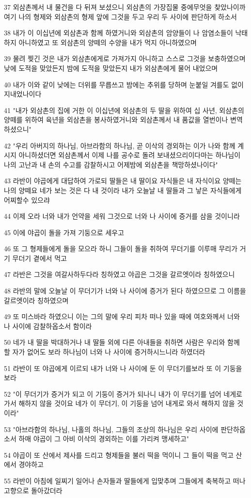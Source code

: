 \par 37 외삼촌께서 내 물건을 다 뒤져 보셨으니 외삼촌의 가장집물 중에무엇을 찾았나이까 여기 나의 형제와 외삼촌의 형제 앞에 그것을 두고 우리 두 사이에 판단하게 하소서
\par 38 내가 이 이십년에 외삼촌과 함께 하였거니와 외삼촌의 암양들이 나 암염소들이 낙태하지 아니하였고 또 외삼촌의 양떼의 수양을 내가 먹지 아니하였으며
\par 39 물려 찢긴 것은 내가 외삼촌에게로 가져가지 아니하고 스스로 그것을 보충하였으며 낮에 도적을 맞았든지 밤에 도적을 맞았든지 내가 외삼촌에게 물어 내었으며
\par 40 내가 이와 같이 낮에는 더위를 무릅쓰고 밤에는 추위를 당하며 눈붙일 겨를도 없이 지내었나이다
\par 41 "내가 외삼촌의 집에 거한 이 이십년에 외삼촌의 두 딸을 위하여 십 사년, 외삼촌의 양떼를 위하여 육년을 외삼촌을 봉사하였거니와 외삼촌께서 내 품값을 열번이나 변역하셨으니"
\par 42 "우리 아버지의 하나님, 아브라함의 하나님, 곧 이삭의 경외하는 이가 나와 함께 계시지 아니하셨더면 외삼촌께서 이제 나를 공수로 돌려 보내셨으리이다마는 하나님이 나의 고난과 내 손의 수고를 감찰하시고 어제밤에 외삼촌을 책망하셨나이다"
\par 43 라반이 야곱에게 대답하여 가로되 딸들은 내 딸이요 자식들은 내 자식이요 양떼는 나의 양떼요 네가 보는 것은 다 내 것이라 내가 오늘날 내 딸들과 그 낳은 자식들에게 어찌할수 있으랴
\par 44 이제 오라 너와 내가 언약을 세워 그것으로 너와 나 사이에 증거를 삼을 것이니라
\par 45 이에 야곱이 돌을 가져 기둥으로 세우고
\par 46 또 그 형제들에게 돌을 모으라 하니 그들이 돌을 취하여 무더기를 이루매 무리가 거기 무더기 곁에서 먹고
\par 47 라반은 그것을 여갈사하두다라 칭하였고 야곱은 그것을 갈르엣이라 칭하였으니
\par 48 라반의 말에 오늘날 이 무더기가 너와 나 사이에 증거가 된다 하였으므로 그 이름을 갈르엣이라 칭하였으며
\par 49 또 미스바라 하였으니 이는 그의 말에 우리 피차 떠나 있을 때에 여호와께서 너와 나 사이에 감찰하옵소서 함이라
\par 50 네가 내 딸을 박대하거나 내 딸들 외에 다른 아내들을 취하면 사람은 우리와 함께 할 자가 없어도 보라 하나님이 너와 나 사이에 증거하시느니라 하였더라
\par 51 라반이 또 야곱에게 이르되 내가 너와 나 사이에 둔 이 무더기를보라 또 이 기둥을 보라
\par 52 "이 무더기가 증거가 되고 이 기둥이 증거가 되나니 내가 이 무더기를 넘어 네게로 가서 해하지 않을 것이요 네가 이 무더기, 이 기둥을 넘어 내게로 와서 해하지 않을 것이라"
\par 53 "아브라함의 하나님, 나홀의 하나님, 그들의 조상의 하나님은 우리 사이에 판단하옵소서 하매 야곱이 그 아비 이삭의 경외하는 이를 가리켜 맹세하고"
\par 54 야곱이 또 산에서 제사를 드리고 형제들을 불러 떡을 먹이니 그 들이 떡을 먹고 산에서 경야하고
\par 55 라반이 아침에 일찌기 일어나 손자들과 딸들에게 입맞추며 그들에게 축복하고 떠나 고향으로 돌아갔더라


